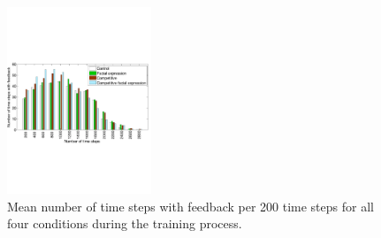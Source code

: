\documentclass[10pt,journal,compsoc]{IEEEtran}
\begin{document}


\begin{figure}
\centering
\includegraphics[width=1\columnwidth, height=2.2in,]{FeedbackFrequency}
\caption{Mean number of time steps with feedback per 200 time steps for all four conditions during the training process.}
\label{feedback}
\end{figure}
\end{document}
